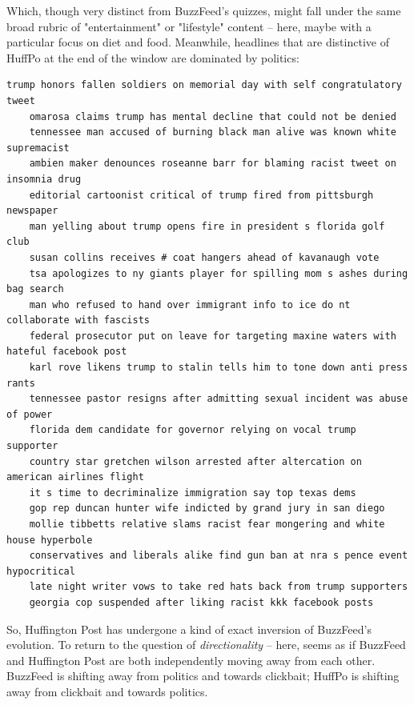 \documentclass{scrartcl}
\begin{document}
Which, though very distinct from BuzzFeed's quizzes, might fall under the same broad rubric of "entertainment" or "lifestyle" content -- here, maybe with a particular focus on diet and food. Meanwhile, headlines that are distinctive of HuffPo at the end of the window are dominated by politics:

\begin{lstlisting}[basicstyle=\tiny\hlfont]
    trump honors fallen soldiers on memorial day with self congratulatory tweet
    omarosa claims trump has mental decline that could not be denied
    tennessee man accused of burning black man alive was known white supremacist
    ambien maker denounces roseanne barr for blaming racist tweet on insomnia drug
    editorial cartoonist critical of trump fired from pittsburgh newspaper
    man yelling about trump opens fire in president s florida golf club
    susan collins receives # coat hangers ahead of kavanaugh vote
    tsa apologizes to ny giants player for spilling mom s ashes during bag search
    man who refused to hand over immigrant info to ice do nt collaborate with fascists
    federal prosecutor put on leave for targeting maxine waters with hateful facebook post
    karl rove likens trump to stalin tells him to tone down anti press rants
    tennessee pastor resigns after admitting sexual incident was abuse of power
    florida dem candidate for governor relying on vocal trump supporter
    country star gretchen wilson arrested after altercation on american airlines flight
    it s time to decriminalize immigration say top texas dems
    gop rep duncan hunter wife indicted by grand jury in san diego
    mollie tibbetts relative slams racist fear mongering and white house hyperbole
    conservatives and liberals alike find gun ban at nra s pence event hypocritical
    late night writer vows to take red hats back from trump supporters
    georgia cop suspended after liking racist kkk facebook posts
\end{lstlisting}

So, Huffington Post has undergone a kind of exact inversion of BuzzFeed's evolution. To return to the question of \textit{directionality} -- here, seems as if BuzzFeed and Huffington Post are both independently moving away from each other. BuzzFeed is shifting away from politics and towards clickbait; HuffPo is shifting away from clickbait and towards politics.
\end{document}
